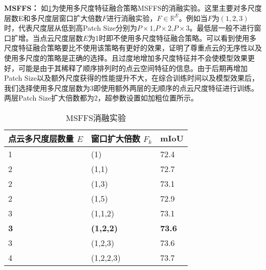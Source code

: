 \documentclass[preprint,12pt]{elsarticle}
\begin{document}
\textbf{MSFFS：}
如\cref{tab:MSFFS}为使用多尺度特征融合策略MSFFS的消融实验。这里主要对多尺度层数E和多尺度层窗口扩大倍数$F$进行消融实验，$F\in \mathbb{R}^{E}$。例如当$F$为$(1,2,3)$时，代表尺度层从低到高Patch Size分别为$P\times 1$,$P\times 2$,$P\times 3$。最低层一般不进行窗口扩增。当点云尺度层数$E$为1时即不使用多尺度特征融合策略。可以看到使用多尺度特征融合策略要比不使用该策略有更好的效果，证明了尊重点云的无序性以及使用多尺度的策略是正确的选择。且过度地增加多尺度特征并不会使模型效果更好，可能是由于其稀释了顺序排列时的点云空间特征的信息。由于后期再增加Patch Size以及额外尺度获得的性能提升不大，在综合训练时间以及模型效果后，我们选择使用多尺度层数为3即使用额外两层的无顺序的点云尺度特征进行训练。两层Patch Size扩大倍数都为2，超参数设置如加粗位置所示。
\begin{table}[htbp!]
	\centering
	\caption{MSFFS消融实验}
	\label{tab:MSFFS}
	\begin{tabular}{@{}lll@{}}
		\toprule
		点云多尺度层数量 $E$ & 窗口扩大倍数 $F_{k}$     & mIoU          \\ \midrule
		1          & (1)              & 72.4          \\
		2          & (1,1)              & 72.7          \\
		2          & (1,3)              & 73.1          \\
		2          & (1,5)              & 72.9          \\
		3          & (1,1,2)          & 73.1          \\
		\textbf{3} & \textbf{(1,2,2)} & \textbf{73.6} \\
		3          & (1,2,3)          & 73.6          \\
		4          & (1,2,2,3)        & 73.7          \\ \bottomrule
	\end{tabular}
\end{table}


\end{document}
